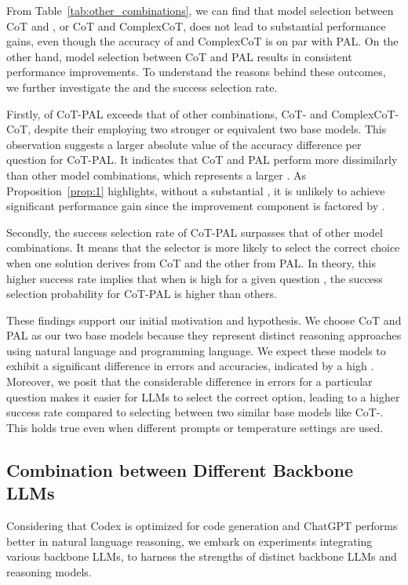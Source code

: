 \documentclass[11pt]{article}
\begin{document}
From Table~\ref{tab:other_combinations}, we can find that model selection between CoT and , or CoT and ComplexCoT, does not lead to substantial performance gains, even though the accuracy of  and ComplexCoT is on par with PAL. On the other hand, model selection between CoT and PAL results in consistent performance improvements. To understand the reasons behind these outcomes, we further investigate the  and the success selection rate. 

Firstly,  of CoT-PAL exceeds that of other combinations, CoT- and ComplexCoT-CoT, despite their employing two stronger or equivalent two base models. This observation suggests a larger absolute value of the accuracy difference per question for CoT-PAL. It indicates that CoT and PAL perform more dissimilarly than other model combinations, which represents a larger . As Proposition~\ref{prop:1} highlights, without a substantial , it is unlikely to achieve significant performance gain since the improvement component is factored by .

Secondly, the success selection rate of CoT-PAL surpasses that of other model combinations. It means that the selector is more likely to select the correct choice when one solution derives from CoT and the other from PAL. In theory, this higher success rate implies that when  is high for a given question , the success selection probability  for CoT-PAL is higher than others.

These findings support our initial motivation and hypothesis. We choose CoT and PAL as our two base models because they represent distinct reasoning approaches using natural language and programming language. We expect these models to exhibit a significant difference in errors and accuracies, indicated by a high . Moreover, we posit that the considerable difference in errors for a particular question makes it easier for LLMs to select the correct option, leading to a higher success rate compared to selecting between two similar base models like CoT-. This holds true even when different prompts or temperature settings are used. 

\subsection{Combination between Different Backbone LLMs}
Considering that Codex is optimized for code generation and ChatGPT performs better in natural language reasoning, we embark on experiments integrating various backbone LLMs, to harness the strengths of distinct backbone LLMs and reasoning models.
\end{document}
